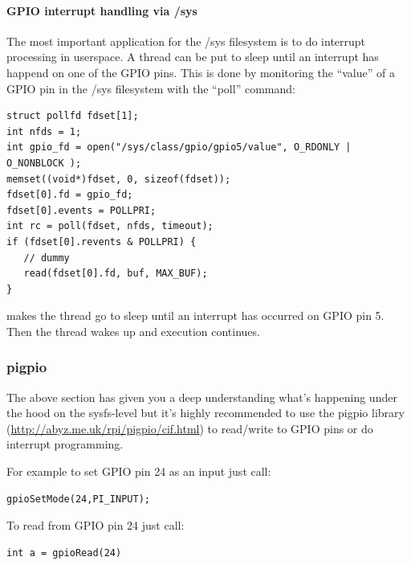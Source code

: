 \documentclass[12pt]{report}
\begin{document}
\paragraph{GPIO interrupt handling via /sys\label{gpioIRQ}}
The most important application for the /sys filesystem is to
do interrupt processing in userspace.
A thread can be put to sleep until an interrupt has happend on one of
the GPIO pins. This is done by monitoring the ``value''
of a GPIO pin in the /sys filesystem with the ``poll'' command:
\begin{verbatim}
struct pollfd fdset[1];
int nfds = 1;
int gpio_fd = open("/sys/class/gpio/gpio5/value", O_RDONLY | O_NONBLOCK );
memset((void*)fdset, 0, sizeof(fdset));
fdset[0].fd = gpio_fd;
fdset[0].events = POLLPRI;
int rc = poll(fdset, nfds, timeout);
if (fdset[0].revents & POLLPRI) {
   // dummy
   read(fdset[0].fd, buf, MAX_BUF);
}
\end{verbatim}
makes the thread go to sleep until an interrupt has occurred on
GPIO pin 5. Then the thread wakes up and execution continues.

\subsubsection{pigpio}
The above section has given you a deep understanding what's happening
under the hood on the sysfs-level but it's highly recommended to
use the pigpio library (\url{http://abyz.me.uk/rpi/pigpio/cif.html})
to read/write to GPIO pins or do interrupt programming.

For example to set GPIO pin 24 as an input just call:
\begin{verbatim}
gpioSetMode(24,PI_INPUT);
\end{verbatim}

To read from GPIO pin 24 just call:
\begin{verbatim}
int a = gpioRead(24)
\end{verbatim}
\end{document}
